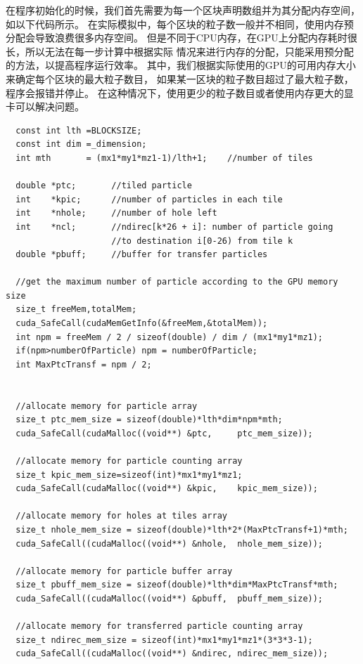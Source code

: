 在程序初始化的时候，我们首先需要为每一个区块声明数组并为其分配内存空间，如以下代码所示。
在实际模拟中，每个区块的粒子数一般并不相同，使用内存预分配会导致浪费很多内存空间。
但是不同于CPU内存，在GPU上分配内存耗时很长，所以无法在每一步计算中根据实际
情况来进行内存的分配，只能采用预分配的方法，以提高程序运行效率。
其中，我们根据实际使用的GPU的可用内存大小来确定每个区块的最大粒子数目，
如果某一区块的粒子数目超过了最大粒子数，程序会报错并停止。
在这种情况下，使用更少的粒子数目或者使用内存更大的显卡可以解决问题。

\begin{lstlisting}
  const int lth =BLOCKSIZE;
  const int dim =_dimension;
  int mth       = (mx1*my1*mz1-1)/lth+1;    //number of tiles

  double *ptc;       //tiled particle
  int    *kpic;      //number of particles in each tile
  int    *nhole;     //number of hole left
  int    *ncl;       //ndirec[k*26 + i]: number of particle going
                     //to destination i[0-26) from tile k
  double *pbuff;     //buffer for transfer particles

  //get the maximum number of particle according to the GPU memory size
  size_t freeMem,totalMem;
  cuda_SafeCall(cudaMemGetInfo(&freeMem,&totalMem));
  int npm = freeMem / 2 / sizeof(double) / dim / (mx1*my1*mz1);
  if(npm>numberOfParticle) npm = numberOfParticle;
  int MaxPtcTransf = npm / 2;


  //allocate memory for particle array
  size_t ptc_mem_size = sizeof(double)*lth*dim*npm*mth;
  cuda_SafeCall(cudaMalloc((void**) &ptc,     ptc_mem_size));

  //allocate memory for particle counting array
  size_t kpic_mem_size=sizeof(int)*mx1*my1*mz1;
  cuda_SafeCall(cudaMalloc((void**) &kpic,    kpic_mem_size));

  //allocate memory for holes at tiles array
  size_t nhole_mem_size = sizeof(double)*lth*2*(MaxPtcTransf+1)*mth;
  cuda_SafeCall((cudaMalloc((void**) &nhole,  nhole_mem_size));

  //allocate memory for particle buffer array
  size_t pbuff_mem_size = sizeof(double)*lth*dim*MaxPtcTransf*mth;
  cuda_SafeCall((cudaMalloc((void**) &pbuff,  pbuff_mem_size));

  //allocate memory for transferred particle counting array
  size_t ndirec_mem_size = sizeof(int)*mx1*my1*mz1*(3*3*3-1);
  cuda_SafeCall((cudaMalloc((void**) &ndirec, ndirec_mem_size));
\end{lstlisting}


